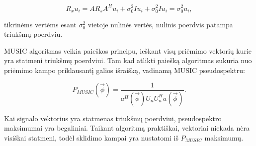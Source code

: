 \documentclass[main.tex]{subfiles}
\begin{document}
\begin{equation}
    R_xu_i=AR_sA^Hu_i+\sigma^2_0Iu_i+\sigma^2_0Iu_i=\sigma^2_0u_i,
\end{equation}

\noindent tikrinėms vertėms esant $\sigma^2_0$ vietoje nulinės vertės, nulinis
poerdvis patampa triukšmų poerdviu.

MUSIC algoritmas veikia paieškos principu, ieškant visų priėmimo vektorių kurie
yra statmeni triukšmų poerdviui. Tam kad atlikti paiešką algoritmas sukuria
nuo priėmimo kampo priklausantį galios išraišką, vadinamą MUSIC pseudospektru:

\begin{equation}
    P_{MUSIC}(\overrightarrow{\phi}) = \frac{1}{a^H(\overrightarrow{\phi})U_nU_n^Ha(\overrightarrow{\phi})}.
\end{equation}

\noindent Kai signalo vektorius yra statmenas triukšmų poerdviui, pseudospektro maksimumai
yra begaliniai. Taikant algoritmą praktiškai, vektoriai niekada nėra visiškai statmeni,
todėl sklidimo kampai yra nustatomi iš $P_{MUSIC}$ maksimumų.
\end{document}
